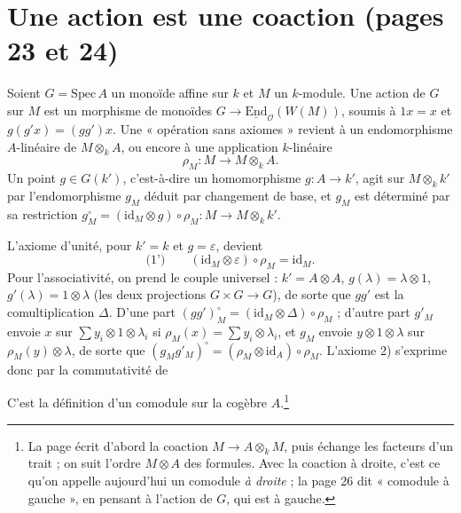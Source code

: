\documentclass[11pt,a4paper]{article}
\begin{document}
\section*{Une action est une coaction (pages 23 et 24)}

Soient $G = \mathrm{Spec}\, A$ un monoïde affine sur $k$ et $M$ un $k$-module.
Une action de $G$ sur $M$ est un morphisme de monoïdes
$G \to \underline{\mathrm{End}}_{\mathcal{O}}(W(M))$, soumis à $1 x = x$ et
$g(g' x) = (g g') x$. Une « opération sans axiomes » revient à un
endomorphisme $A$-linéaire de $M \otimes_{k} A$, ou encore à une application
$k$-linéaire
\[
  \rho_{M} \colon M \longrightarrow M \otimes_{k} A .
\]
Un point $g \in G(k')$, c'est-à-dire un homomorphisme $g \colon A \to k'$,
agit sur $M \otimes_{k} k'$ par l'endomorphisme $g_{M}$ déduit par changement
de base, et $g_{M}$ est déterminé par sa restriction
$g_{M}^{\circ} = (\mathrm{id}_{M} \otimes g) \circ \rho_{M} \colon M \to M \otimes_{k} k'$.

L'axiome d'unité, pour $k' = k$ et $g = \varepsilon$, devient
\[
  \text{(1')} \qquad (\mathrm{id}_{M} \otimes \varepsilon) \circ \rho_{M} = \mathrm{id}_{M} .
\]
Pour l'associativité, on prend le couple universel : $k' = A \otimes A$,
$g(\lambda) = \lambda \otimes 1$, $g'(\lambda) = 1 \otimes \lambda$ (les deux
projections $G \times G \to G$), de sorte que $g g'$ est la comultiplication
$\Delta$. D'une part $(g g')_{M}^{\circ} = (\mathrm{id}_{M} \otimes \Delta)
\circ \rho_{M}$ ; d'autre part $g'_{M}$ envoie $x$ sur
$\sum y_{i} \otimes 1 \otimes \lambda_{i}$ si
$\rho_{M}(x) = \sum y_{i} \otimes \lambda_{i}$, et $g_{M}$ envoie
$y \otimes 1 \otimes \lambda$ sur $\rho_{M}(y) \otimes \lambda$, de sorte que
$(g_{M} g'_{M})^{\circ} = (\rho_{M} \otimes \mathrm{id}_{A}) \circ \rho_{M}$.
L'axiome 2) s'exprime donc par la commutativité de


C'est la définition d'un comodule sur la cogèbre $A$.\footnote{La page écrit
d'abord la coaction $M \to A \otimes_{k} M$, puis échange les facteurs d'un
trait ; on suit l'ordre $M \otimes A$ des formules. Avec la coaction à droite,
c'est ce qu'on appelle aujourd'hui un comodule \emph{à droite} ; la page 26
dit « comodule à gauche », en pensant à l'action de $G$, qui est à gauche.}
\end{document}

